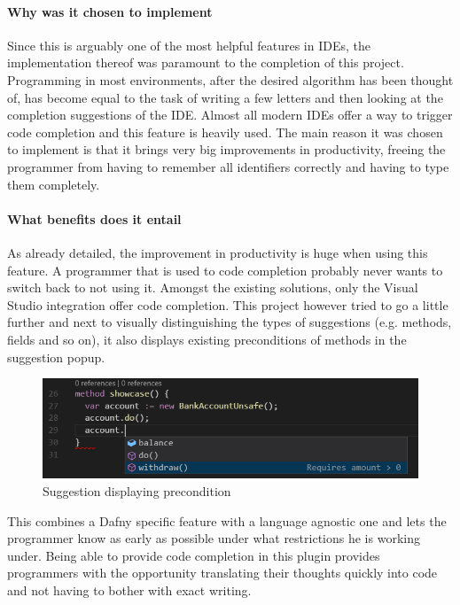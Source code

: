 \paragraph{Why was it chosen to implement}
Since this is arguably one of the most helpful features in IDEs, the implementation thereof was paramount to the completion of this project. Programming in most environments, after the desired algorithm has been thought of, has become equal to the task of writing a few letters and then looking at the completion suggestions of the IDE.  \newline
Almost all modern IDEs offer a way to trigger code completion and this feature is heavily used. The main reason it was chosen to implement is that it brings very big improvements in productivity, freeing the programmer from having to remember all identifiers correctly and having to type them completely.
\paragraph{What benefits does it entail}
As already detailed, the improvement in productivity is huge when using this feature. A programmer that is used to code completion probably never wants to switch back to not using it. Amongst the existing solutions, only the Visual Studio integration offer code completion. This project however tried to go a little further and next to visually distinguishing the types of suggestions (e.g. methods, fields and so on), it also displays existing preconditions of methods in the suggestion popup. \newline
\begin{figure}[H]
	\centering
	\includegraphics[width=1\textwidth]{img/codeCompletionMethod}
	\caption{Suggestion displaying precondition}
	\label{fig:agcodecompletionmethod}
\end{figure}
This combines a Dafny specific feature with a language agnostic one and lets the programmer know as early as possible under what restrictions he is working under. Being able to provide code completion in this plugin provides programmers with the opportunity translating their thoughts quickly into code and not having to bother with exact writing.
